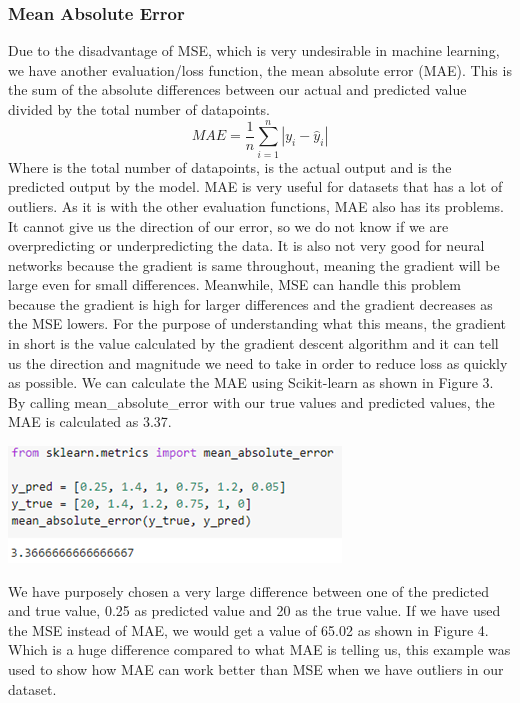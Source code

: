 \documentclass[a4paper,12pt]{report}
\begin{document}
\subsubsection{Mean Absolute Error}

Due to the disadvantage of MSE, which is very undesirable in machine learning, we have another evaluation/loss function, the mean absolute error (MAE). This is the sum of the absolute differences between our actual and predicted value divided by the total number of datapoints.
$$MAE=\frac{1}{n}\sum_{i=1}^n|y_i-\hat{y}_i|$$
Where  is the total number of datapoints,  is the actual output and  is the predicted output by the model. MAE is very useful for datasets that has a lot of outliers. As it is with the other evaluation functions, MAE also has its problems. It cannot give us the direction of our error, so we do not know if we are overpredicting or underpredicting the data. It is also not very good for neural networks because the gradient is same throughout, meaning the gradient will be large even for small differences. Meanwhile, MSE can handle this problem because the gradient is high for larger differences and the gradient decreases as the MSE lowers. For the purpose of understanding what this means, the gradient in short is the value calculated by the gradient descent algorithm and it can tell us the direction and magnitude we need to take in order to reduce loss as quickly as possible. We can calculate the MAE using Scikit-learn as shown in Figure 3. By calling mean\_absolute\_error with our true values and predicted values, the MAE is calculated as 3.37.

\begin{center}
    \captionsetup{type=figure}
    \includegraphics[width=.6\linewidth]{media/MAEcode.png}
\end{center}

We have purposely chosen a very large difference between one of the predicted and true value, 0.25 as predicted value and 20 as the true value. If  we have used the MSE instead of MAE, we would get a value of 65.02 as shown in Figure 4. Which is a huge difference compared to what MAE is telling us, this example was used to show how MAE can work better than MSE when we have outliers in our dataset.
\end{document}
